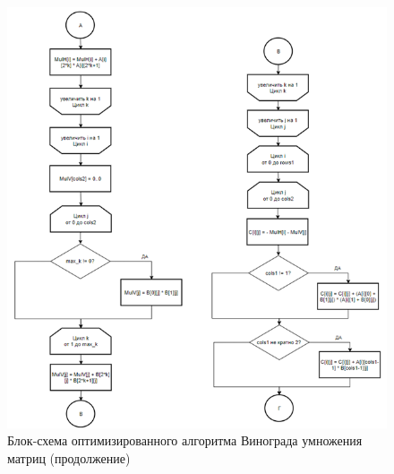 \begin{figure}[H]
    \centering
    \includegraphics[width=1.05\textwidth]{img/block_3_2.png}
    \caption{Блок-схема оптимизированного алгоритма Винограда умножения матриц (продолжение)}
    \label{fig:block_3_2}
\end{figure}

